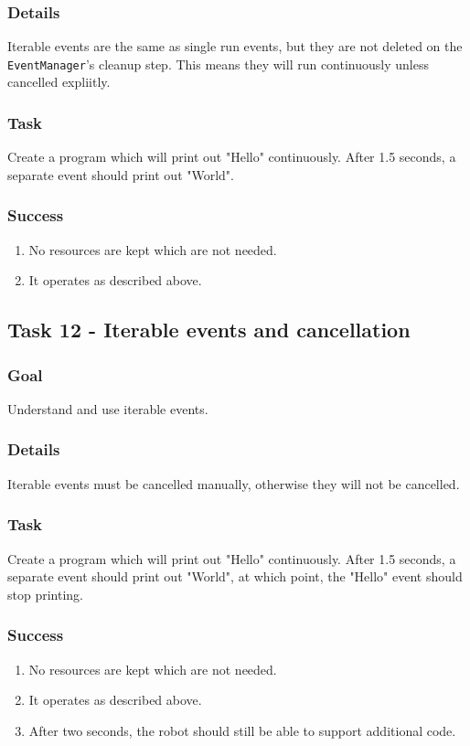 \documentclass[a4paper]{article}
\begin{document}
\subsubsection{Details} Iterable events are the same as single run events, but they are not deleted on the \lstinline{EventManager}'s cleanup step. This means they will run continuously unless cancelled expliitly.
\subsubsection{Task} Create a program which will print out "Hello" continuously. After 1.5 seconds, a separate event should print out "World". 
\subsubsection{Success} \begin{enumerate}\item{No resources are kept which are not needed.}\item{It operates as described above.}\end{enumerate}

\subsection{Task 12 - Iterable events and cancellation}
\subsubsection{Goal} Understand and use iterable events.
\subsubsection{Details} Iterable events must be cancelled manually, otherwise they will not be cancelled.
\subsubsection{Task} Create a program which will print out "Hello" continuously. After 1.5 seconds, a separate event should print out "World", at which point, the "Hello" event should stop printing. 
\subsubsection{Success} \begin{enumerate}\item{No resources are kept which are not needed.}\item{It operates as described above.}\item{After two seconds, the robot should still be able to support additional code.}\end{enumerate}
\end{document}

